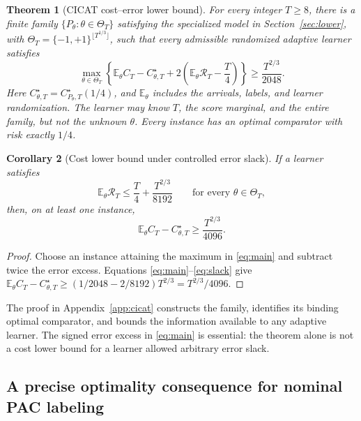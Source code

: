 \documentclass[11pt]{article}
\newtheorem{theorem}{Theorem}[section]
\newtheorem{corollary}[theorem]{Corollary}
\theoremstyle{remark}
\newcommand{\E}{\mathbb E}
\newcommand{\calR}{\mathcal R}
\begin{document}
\begin{theorem}[CICAT cost--error lower bound]
\label{thm:main}
For every integer $T\ge8$, there is a finite family
$\{P_\theta:\theta\in\Theta_T\}$ satisfying the specialized model in Section~\ref{sec:lower}, with
$\Theta_T=\{-1,+1\}^{\lfloor T^{1/3}\rfloor}$, such that every admissible
randomized adaptive learner satisfies
\begin{equation}
 \max_{\theta\in\Theta_T}
 \left\{
  \E_\theta C_T-C^\star_{\theta,T}
  +2\left(\E_\theta\calR_T-\frac T4\right)
 \right\}
 \ge \frac{T^{2/3}}{2048}.
 \label{eq:main}
\end{equation}
Here $C^\star_{\theta,T}=C^\star_{P_\theta,T}(1/4)$, and $\E_\theta$ includes
the arrivals, labels, and learner randomization. The learner may know $T$,
the score marginal, and the entire family, but not the unknown $\theta$.
Every instance has an optimal comparator with risk exactly $1/4$.
\end{theorem}

\begin{corollary}[Cost lower bound under controlled error slack]
\label{cor:cost}
If a learner satisfies
\begin{equation}
 \E_\theta\calR_T\le\frac T4+\frac{T^{2/3}}{8192}
 \qquad\text{for every }\theta\in\Theta_T,
 \label{eq:slack}
\end{equation}
then, on at least one instance,
\begin{equation}
 \E_\theta C_T-C^\star_{\theta,T}\ge\frac{T^{2/3}}{4096}.
 \label{eq:cost-lower}
\end{equation}
\end{corollary}
\begin{proof}
Choose an instance attaining the maximum in \eqref{eq:main} and subtract
twice the error excess. Equations \eqref{eq:main}--\eqref{eq:slack} give
$\E_\theta C_T-C^\star_{\theta,T}
\ge(1/2048-2/8192)T^{2/3}=T^{2/3}/4096$.
\end{proof}

The proof in Appendix~\ref{app:cicat} constructs the family, identifies
its binding optimal comparator, and bounds the information available to
any adaptive learner. The signed error excess in \eqref{eq:main} is
essential: the theorem alone is not a cost lower bound for a learner
allowed arbitrary error slack.

\subsection{A precise optimality consequence for nominal PAC labeling}
\end{document}
